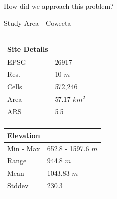 \documentclass[
  ignorenonframetext,
]{beamer}
\begin{document}
\begin{frame}[fragile]{How did we approach this problem?}
\begin{block}{Study Area - Coweeta}
\begin{columns}[T]
\begin{column}{0.5\textwidth}
\begin{longtable}[]{@{}ll@{}}
\toprule\noalign{}
Site Details & \\
\midrule\noalign{}
\endhead
EPSG & 26917 \\
Res. & 10 \(m\) \\
Cells & 572,246 \\
Area & 57.17 \(km^2\) \\
ARS & 5.5 \\
\bottomrule\noalign{}
\end{longtable}

\begin{longtable}[]{@{}ll@{}}
\toprule\noalign{}
Elevation & \\
\midrule\noalign{}
\endhead
Min - Max & 652.8 - 1597.6 \(m\) \\
Range & 944.8 \(m\) \\
Mean & 1043.83 \(m\) \\
Stddev & 230.3 \\
\bottomrule\noalign{}
\end{longtable}
\end{column}
\end{columns}
\end{block}


\end{frame}
\end{document}

